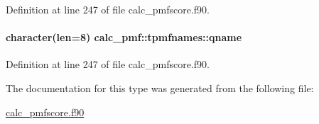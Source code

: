 Definition at line 247 of file calc\-\_\-pmfscore.\-f90.

\hypertarget{structcalc__pmf_1_1tpmfnames_a9cab1ea5a258960e24cf9ec1eb48c3ba}{
\paragraph[{qname}]{\setlength{\rightskip}{0pt plus 5cm}character(len=8) calc\-\_\-pmf\-::tpmfnames\-::qname}}\label{structcalc__pmf_1_1tpmfnames_a9cab1ea5a258960e24cf9ec1eb48c3ba}


Definition at line 247 of file calc\-\_\-pmfscore.\-f90.



The documentation for this type was generated from the following file\-:\begin{DoxyCompactItemize}
\item 
\hyperlink{calc__pmfscore_8f90}{calc\-\_\-pmfscore.\-f90}\end{DoxyCompactItemize}
